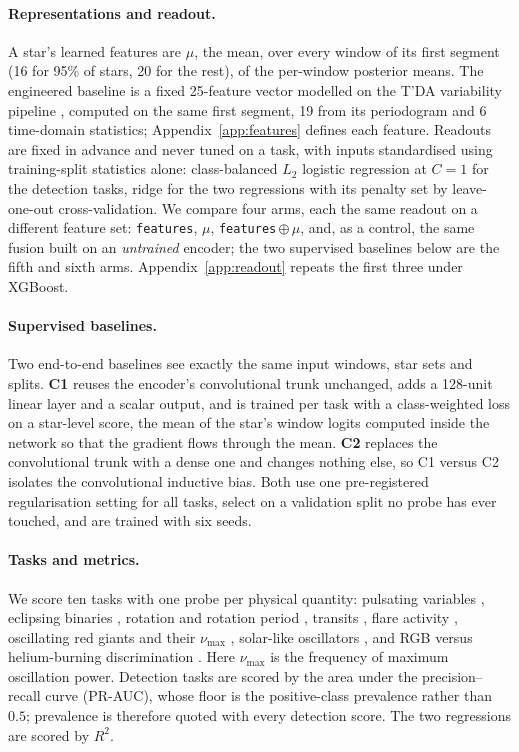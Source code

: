 \documentclass{article}
\begin{document}
\paragraph{Representations and readout.} A star's learned features are $\mu$, the mean, over every
window of its first segment (16 for 95\% of stars, 20 for the rest), of the per-window posterior
means. The engineered baseline is a fixed 25-feature vector modelled on the T'DA variability pipeline
\citep{audenaert2021}, computed on the same first segment, 19 from its periodogram and 6 time-domain statistics; Appendix~\ref{app:features} defines each feature. Readouts are fixed in advance and never
tuned on a task, with inputs standardised using training-split statistics alone: class-balanced $L_{2}$ logistic regression
at $C = 1$ for the detection tasks, ridge for the two regressions with its penalty set by leave-one-out
cross-validation. We compare four
arms, each the same readout on a different feature set: \texttt{features}, $\mu$,
\texttt{features}\,$\oplus\,\mu$, and, as a control, the same fusion built on an \emph{untrained}
encoder; the two supervised baselines below are the fifth and sixth arms.
Appendix~\ref{app:readout} repeats the first three under XGBoost.

\paragraph{Supervised baselines.} Two end-to-end baselines see exactly the same input windows, star
sets and splits. \textbf{C1} reuses the encoder's convolutional trunk unchanged, adds a 128-unit linear layer
and a scalar output, and is trained per task with a class-weighted loss on a star-level score, the mean of the star's window
logits computed inside the network so that the gradient flows through the mean. \textbf{C2} replaces the convolutional trunk with a
dense one and changes nothing else, so C1 versus C2 isolates the convolutional inductive bias. Both
use one pre-registered regularisation setting for all tasks, select on a validation split no probe
has ever touched, and are trained with six seeds.

\paragraph{Tasks and metrics.} We score ten tasks with one probe per physical quantity: pulsating
variables \citep{gao2025}, eclipsing binaries \citep{prsa2022}, rotation and rotation period
\citep{boyle2026}, transits \citep{guerrero2021}, flare activity \citep{seli2025,vida2021},
oscillating red giants and their $\nu_{\max}$ \citep{hon2021}, solar-like oscillators
\citep{hatt2023}, and RGB versus helium-burning discrimination \citep{sreenivas2026}. Here
$\nu_{\max}$ is the frequency of maximum oscillation power. Detection tasks are scored by the area
under the precision--recall curve (PR-AUC), whose floor is the positive-class prevalence rather than
$0.5$; prevalence is therefore quoted with every detection score. The two regressions are scored by
$R^{2}$.
\end{document}
